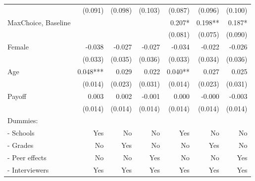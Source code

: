 \begin{table}[htbp]
\begin{adjustbox}{width=1\textwidth}
\begin{threeparttable}
\begin{tabular}{l*{6}{D{.}{.}{-1}}}
                    &             (0.091)   &             (0.098)   &             (0.103)   &             (0.087)   &             (0.096)   &             (0.100)   \\
MaxChoice, Baseline &                       &                       &                       &               0.207*  &               0.198** &               0.187*  \\
                    &                       &                       &                       &             (0.081)   &             (0.075)   &             (0.090)   \\
Female              &              -0.038   &              -0.027   &              -0.027   &              -0.034   &              -0.022   &              -0.026   \\
                    &             (0.033)   &             (0.035)   &             (0.036)   &             (0.033)   &             (0.034)   &             (0.036)   \\
Age                 &               0.048***&               0.029   &               0.022   &               0.040** &               0.027   &               0.025   \\
                    &             (0.014)   &             (0.023)   &             (0.031)   &             (0.014)   &             (0.023)   &             (0.031)   \\
Payoff              &               0.003   &               0.002   &              -0.001   &               0.000   &              -0.000   &              -0.003   \\
                    &             (0.014)   &             (0.014)   &             (0.014)   &             (0.014)   &             (0.014)   &             (0.014)   \\ \midrule
Dummies: &&&&&& \\
- Schools             &                 Yes   &                  No   &                  No   &                 Yes   &                  No   &                  No   \\
- Grades              &                  No   &                 Yes   &                  No   &                  No   &                 Yes   &                  No   \\
- Peer effects        &                  No   &                  No   &                 Yes   &                  No   &                  No   &                 Yes   \\
- Interviewers        &                 Yes   &                 Yes   &                 Yes   &                 Yes   &                 Yes   &                 Yes   \\

\end{tabular}
\end{threeparttable}
\end{adjustbox}
\end{table}
